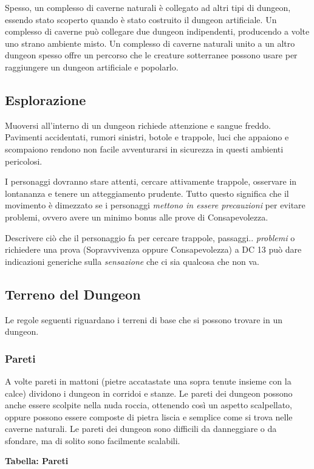 \begin{multicols}{2}
Spesso, un complesso di caverne naturali è collegato ad altri tipi di dungeon, essendo stato scoperto quando è stato costruito il dungeon artificiale. Un complesso di caverne può collegare due dungeon indipendenti, producendo a volte uno strano ambiente misto. Un complesso di caverne naturali unito a un altro dungeon spesso offre un percorso che le creature sotterranee possono usare per raggiungere un dungeon artificiale e popolarlo.

\subsection{Esplorazione}

Muoversi all'interno di un dungeon richiede attenzione e sangue freddo. Pavimenti accidentati, rumori sinistri, botole e trappole, luci che appaiono e scompaiono rendono non facile avventurarsi in sicurezza in questi ambienti pericolosi.

I personaggi dovranno stare attenti, cercare attivamente trappole, osservare in lontananza e tenere un atteggiamento prudente. Tutto questo significa che il movimento è dimezzato se i personaggi \emph{mettono in essere precauzioni} per evitare problemi, ovvero avere un minimo bonus alle prove di Consapevolezza.

Descrivere ciò che il personaggio fa per cercare trappole, passaggi.. \emph{problemi} o richiedere una prova (Sopravvivenza oppure Consapevolezza) a DC 13 può dare indicazioni generiche sulla \emph{sensazione} che ci sia qualcosa che non va.

\subsection{Terreno del Dungeon}

Le regole seguenti riguardano i terreni di base che si possono trovare in un dungeon.

\subsubsection{Pareti}\label{pareti}\hypertarget{pareti}{}

A volte pareti in mattoni (pietre accatastate una sopra tenute insieme con la calce) dividono i dungeon in corridoi e stanze. Le pareti dei dungeon possono anche essere scolpite nella nuda roccia, ottenendo così un aspetto scalpellato, oppure possono essere composte di pietra liscia e semplice come si trova nelle caverne naturali. Le pareti dei dungeon sono difficili da danneggiare o da sfondare, ma di solito sono facilmente scalabili.

\end{multicols}
\textbf{Tabella: Pareti}
\medskip

